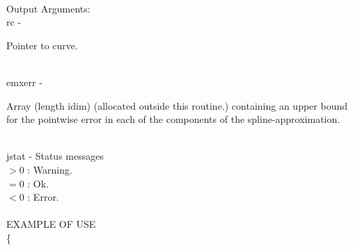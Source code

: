 \\
	\>Output Arguments:\\
        \>\>    {\fov rc}\> - \>  \begin{minipg2}
                     Pointer to curve.
                               \end{minipg2}\\
        \>\>    {\fov emxerr}\> - \>  \begin{minipg2}
                     Array (length idim) (allocated outside this routine.)
                  containing an upper bound for the pointwise error
                  in each of the components of the spline-approximation.
                               \end{minipg2}\\
        \>\>    {\fov jstat}     \> - \> Status messages\\
                \>\>\>\>\>              $> 0$   : Warning.\\
                \>\>\>\>\>              $= 0$   : Ok.\\
                \>\>\>\>\>              $< 0$   : Error.\\
\\
EXAMPLE OF USE\\
		\>      \{ \\

